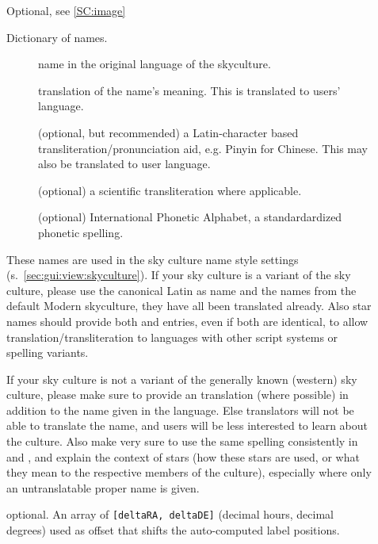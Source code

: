 \begin{description}
\item[] Optional, see \ref{SC:image}
\item[] Dictionary of names. %

	\begin{description}
	    \item[] name in the original language of the skyculture. 
	    \item[] translation of the name's meaning. This is translated to users' language.
	    \item[] (optional, but recommended) a Latin-character based transliteration/pronunciation aid, e.g. Pinyin for Chinese. This may also be translated to user language.
	    \item[] (optional) a scientific transliteration where applicable. 
	    \item[] (optional) International Phonetic Alphabet, a standardardized phonetic spelling.
	\end{description}

	These names are used in the sky culture name style settings (s.~\ref{sec:gui:view:skyculture}). 
	If your sky culture is a variant of the  sky culture, 
	please use the canonical Latin as  name and the  names from the default Modern skyculture, they have all been translated already.
	Also star names should provide both  and  entries, even if both are identical, 
	to allow translation/transliteration to languages with other script systems or spelling variants.

	If your sky culture is not a variant of the generally known  (western)
	sky culture, please make sure to provide an  translation (where possible) in addition to the name given in
	the  language. Else translators will not be able to translate
	the name, and users will be less interested to learn about the culture. 
	Also make very sure to use the same spelling consistently in  and , 
	and explain the context of stars (how these stars are used, or what they mean to the respective members of the culture), 
	especially where only an untranslatable proper name is given.

\item[] optional. An array of \texttt{[deltaRA, deltaDE]} (decimal hours, decimal degrees) 
                            used as offset that shifts the auto-computed label positions. 


\end{description}
